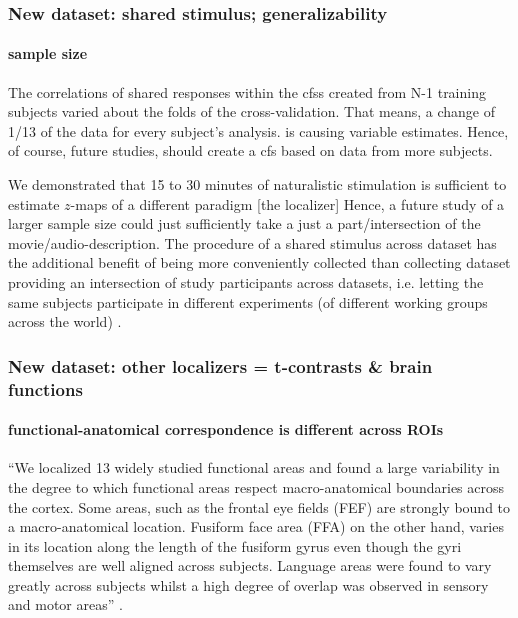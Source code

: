 \subsubsection{New dataset: shared stimulus; generalizability}

\paragraph{sample size}



The correlations of shared responses within the \acp{cfs} created from N-1
training subjects varied about the folds of the cross-validation.
That means, a change of 1/13 of the data for every subject's analysis.
is causing variable estimates.
Hence, of course, future studies, should create a \ac{cfs} based on data from
more subjects.


%
We demonstrated that 15 to 30 minutes of naturalistic stimulation is sufficient
to estimate $z$-maps of a different paradigm [the localizer]
%
Hence, a future study of a larger sample size could just sufficiently take a
just a part/intersection of the movie/audio-description.
%
The procedure of a shared stimulus across dataset has the additional benefit of
being more conveniently collected than collecting dataset providing an
intersection of study participants across datasets, i.e. letting the same
subjects participate in different experiments (of different working groups
across the world) \citep[(s.][ for an \ac{srm} based on "shared subjects acrpss
datasets]{zhang2018transfer}.



\subsubsection{New dataset: other localizers = t-contrasts \& brain functions}

\paragraph{functional-anatomical correspondence is different across ROIs}

%
``We localized 13 widely studied functional areas and found a large variability
in the degree to which functional areas respect macro-anatomical boundaries
across the cortex.
%
Some areas, such as the frontal eye fields (FEF) are strongly bound to a
macro-anatomical location.
%
Fusiform face area (FFA) on the other hand, varies in its location along the
length of the fusiform gyrus even though the gyri themselves are well aligned
across subjects.
%
Language areas were found to vary greatly across subjects whilst a high degree
of overlap was observed in sensory and motor areas'' \citep{frost2012measuring}.

